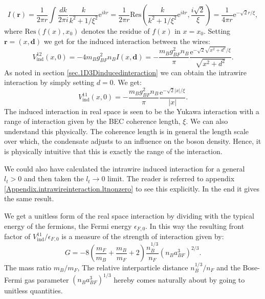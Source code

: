 \begin{equation}
I(\mathbf{r}) = \frac{1}{2\pi r}\int \frac{dk}{2\pi i} \frac{k}{k^2 + 1/\xi^2}\text{e}^{ikr} = \frac{1}{2\pi r}\text{Res}\left(\frac{k}{k^2 + 1/\xi^2}\text{e}^{ikr}, \frac{i\sqrt{2}}{\xi}\right) = \frac{1}{4\pi r} \text{e}^{-\sqrt{2}r/\xi}, \nonumber
\end{equation}
where $\text{Res}(f(x), x_0)$ denotes the residue of $f(x)$ in $x = x_0$. Setting $\mathbf{r} = (x, \mathbf{d})$ we get for the induced interaction between the wires:
\begin{equation}
V^{12}_{\text{ind}}(x, 0) = -4m_Bg^2_{BF}n_B I(x, \mathbf{d}) = -\frac{m_Bg_{BF}^2n_B}{\pi}\frac{\text{e}^{ -\sqrt{2}\sqrt{x^2 + d^2}/\xi }}{\sqrt{x^2 + d^2}}.
\label{eq.V12indx}
\end{equation}
As noted in section \ref{sec.1D3Dinducedinteraction} we can obtain the intrawire interaction by simply setting $d = 0$. We get:
\begin{equation}
V^{11}_{\text{ind}}(x, 0) = -\frac{m_Bg_{BF}^2n_B}{\pi}\frac{\text{e}^{ -\sqrt{2}|x|/\xi }}{|x|}.
\label{eq.V11indx}
\end{equation}
The induced interaction in real space is seen to be the Yukawa interaction with a range of interaction given by the BEC coherence length, $\xi$. We can also understand this physically. The coherence length is in general the length scale over which, the condensate adjusts to an influence on the boson density. Hence, it is physically intuitive that this is exactly the range of the interaction. 

We could also have calculated the intrawire induced interaction for a general $l_t > 0$ and then taken the $l_t \to 0$ limit. The reader is referred to appendix \ref{Appendix.intrawireinteraction.ltnonzero} to see this explicitly. In the end it gives the same result. 

We get a unitless form of the real space interaction by dividing with the typical energy of the fermions, the Fermi energy $\epsilon_{F,0}$. In this way the resulting front factor of $V^{11}_{\text{ind}} / \epsilon_{F,0}$ is a measure of the strength of interaction given by:
\begin{equation}
G = - 8\left( \frac{m_F}{m_B} + \frac{m_B}{m_F} + 2 \right) \frac{n_B^{1/3}}{n_F}(n_Ba_{BF}^3)^{2/3}.
\label{eq.interactionstrength.wires}
\end{equation}
The mass ratio $m_B / m_F$, The relative interparticle distance $n_B^{1/3} / n_F$ and the Bose-Fermi gas parameter $(n_Ba_{BF}^3)^{1/3}$ hereby comes naturally about by going to unitless quantities. 

